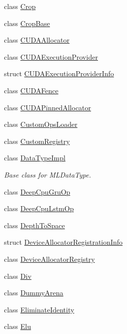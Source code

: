 \begin{DoxyCompactItemize}
class \mbox{\hyperlink{classonnxruntime_1_1Crop}{Crop}}
\item 
class \mbox{\hyperlink{classonnxruntime_1_1CropBase}{Crop\+Base}}
\item 
class \mbox{\hyperlink{classonnxruntime_1_1CUDAAllocator}{C\+U\+D\+A\+Allocator}}
\item 
class \mbox{\hyperlink{classonnxruntime_1_1CUDAExecutionProvider}{C\+U\+D\+A\+Execution\+Provider}}
\item 
struct \mbox{\hyperlink{structonnxruntime_1_1CUDAExecutionProviderInfo}{C\+U\+D\+A\+Execution\+Provider\+Info}}
\item 
class \mbox{\hyperlink{classonnxruntime_1_1CUDAFence}{C\+U\+D\+A\+Fence}}
\item 
class \mbox{\hyperlink{classonnxruntime_1_1CUDAPinnedAllocator}{C\+U\+D\+A\+Pinned\+Allocator}}
\item 
class \mbox{\hyperlink{classonnxruntime_1_1CustomOpsLoader}{Custom\+Ops\+Loader}}
\item 
class \mbox{\hyperlink{classonnxruntime_1_1CustomRegistry}{Custom\+Registry}}
\item 
class \mbox{\hyperlink{classonnxruntime_1_1DataTypeImpl}{Data\+Type\+Impl}}
\begin{DoxyCompactList}\small\item\em Base class for M\+L\+Data\+Type. \end{DoxyCompactList}\item 
class \mbox{\hyperlink{classonnxruntime_1_1DeepCpuGruOp}{Deep\+Cpu\+Gru\+Op}}
\item 
class \mbox{\hyperlink{classonnxruntime_1_1DeepCpuLstmOp}{Deep\+Cpu\+Lstm\+Op}}
\item 
class \mbox{\hyperlink{classonnxruntime_1_1DepthToSpace}{Depth\+To\+Space}}
\item 
struct \mbox{\hyperlink{structonnxruntime_1_1DeviceAllocatorRegistrationInfo}{Device\+Allocator\+Registration\+Info}}
\item 
class \mbox{\hyperlink{classonnxruntime_1_1DeviceAllocatorRegistry}{Device\+Allocator\+Registry}}
\item 
class \mbox{\hyperlink{classonnxruntime_1_1Div}{Div}}
\item 
class \mbox{\hyperlink{classonnxruntime_1_1DummyArena}{Dummy\+Arena}}
\item 
class \mbox{\hyperlink{classonnxruntime_1_1EliminateIdentity}{Eliminate\+Identity}}
\item 
class \mbox{\hyperlink{classonnxruntime_1_1Elu}{Elu}}
\item 

\end{DoxyCompactItemize}
